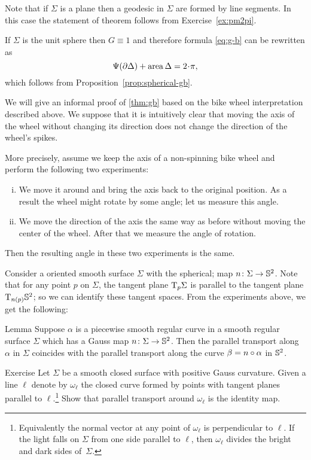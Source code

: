 Note that if $\Sigma$ is a plane then a geodesic in $\Sigma$ are formed by line segments.
In this case the statement of theorem follows from Exercise~\ref{ex:pm2pi}.

 If $\Sigma$ is the unit sphere then $G\equiv1$ and therefore formula \ref{eq:g-b} can be rewritten as 
\[\tgc{\partial\Delta}+\area\Delta=2\cdot \pi,\]
which follows from Proposition~\ref{prop:spherical-gb}.

\medskip

We will give an informal proof of \ref{thm:gb} based on the bike wheel interpretation described above.
We suppose that it is intuitively clear that moving the axis of the wheel without changing its direction does not change the direction of the wheel's spikes.

More precisely, assume we keep the axis of a non-spinning bike wheel and perform the following two experiments:
\begin{enumerate}[(i)]
\item We move it around and bring the axis back to the original position. 
As a result the wheel might rotate by some angle; let us measure this angle.

\item
We move the direction of the axis the same way as before without moving the center of the wheel.
After that we measure the angle of rotation.
\end{enumerate}
Then the resulting angle in these two experiments is the same. 

Consider a oriented smooth surface $\Sigma$ with the spherical; map $n\colon\Sigma\to \mathbb{S}^2$.
Note that for any point $p$ on $\Sigma$, the tangent plane $\mathrm{T}_p\Sigma$ is parallel to the tangent plane $\mathrm{T}_{n(p)}\mathbb{S}^2$; so we can identify these tangent spaces.
From the experiments above, we get the following:

\begin{thm}{Lemma}\label{lem:spherical-image}
Suppose $\alpha$ is a piecewise smooth regular curve in a smooth regular surface $\Sigma$ which has a Gauss map $n\colon\Sigma\to \mathbb{S}^2$.
Then the parallel transport along $\alpha$ in $\Sigma$ coincides with the parallel transport along the curve $\beta=n\circ\alpha$ in $\mathbb{S}^2$.
\end{thm}

\begin{thm}{Exercise}
Let $\Sigma$ be a smooth closed surface with positive Gauss curvature.
Given a line $\ell$ denote by $\omega_\ell$ the closed curve formed by points with tangent planes parallel to $\ell$.\footnote{Equivalently the normal vector at any point of $\omega_\ell$ is perpendicular to $\ell$. If the light falls on $\Sigma$ from one side parallel to $\ell$, then $\omega_\ell$ divides the bright and dark sides of~$\Sigma$.}
Show that parallel transport around $\omega_\ell$ is the identity map.
\end{thm}

